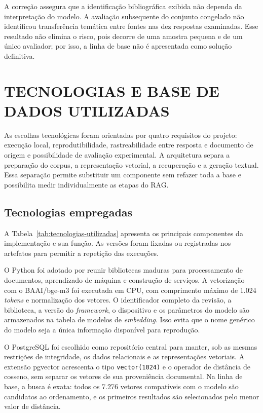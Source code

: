 A correção assegura que a identificação bibliográfica exibida não dependa da interpretação do modelo. A avaliação subsequente do conjunto congelado não identificou transferência temática entre fontes nas dez respostas examinadas. Esse resultado não elimina o risco, pois decorre de uma amostra pequena e de um único avaliador; por isso, a linha de base não é apresentada como solução definitiva.

\chapter{TECNOLOGIAS E BASE DE DADOS UTILIZADAS}

As escolhas tecnológicas foram orientadas por quatro requisitos do projeto: execução local, reprodutibilidade, rastreabilidade entre resposta e documento de origem e possibilidade de avaliação experimental. A arquitetura separa a preparação do corpus, a representação vetorial, a recuperação e a geração textual. Essa separação permite substituir um componente sem refazer toda a base e possibilita medir individualmente as etapas do RAG.

\section{Tecnologias empregadas}

A Tabela~\ref{tab:tecnologias-utilizadas} apresenta os principais componentes da implementação e sua função. As versões foram fixadas ou registradas nos artefatos para permitir a repetição das execuções.

O Python foi adotado por reunir bibliotecas maduras para processamento de documentos, aprendizado de máquina e construção de serviços. A vetorização com o BAAI/bge-m3 foi executada em CPU, com comprimento máximo de 1.024 \textit{tokens} e normalização dos vetores. O identificador completo da revisão, a biblioteca, a versão do \textit{framework}, o dispositivo e os parâmetros do modelo são armazenados na tabela de modelos de \textit{embedding}. Isso evita que o nome genérico do modelo seja a única informação disponível para reprodução.

O PostgreSQL foi escolhido como repositório central para manter, sob as mesmas restrições de integridade, os dados relacionais e as representações vetoriais. A extensão pgvector acrescenta o tipo \texttt{vector(1024)} e o operador de distância de cosseno, sem separar os vetores de sua proveniência documental. Na linha de base, a busca é exata: todos os 7.276 vetores compatíveis com o modelo são candidatos ao ordenamento, e os primeiros resultados são selecionados pelo menor valor de distância.

